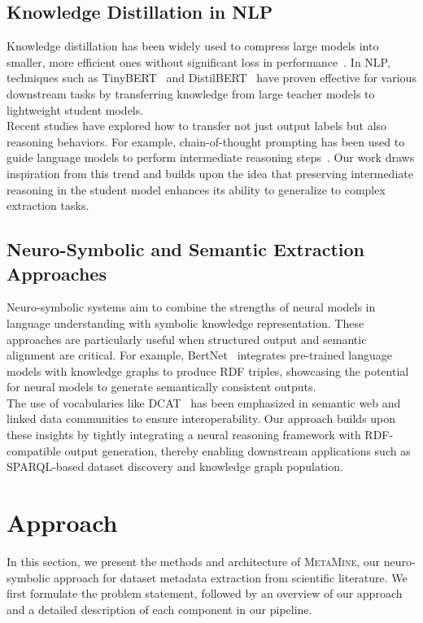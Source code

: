 \documentclass[runningheads]{llncs}
\begin{document}
\subsection{Knowledge Distillation in NLP}
Knowledge distillation has been widely used to compress large models into smaller, more efficient ones without significant loss in performance~\cite{hinton2015distilling}. In NLP, techniques such as TinyBERT~\cite{jiao2019tinybert} and DistilBERT~\cite{sanh2019distilbert} have proven effective for various downstream tasks by transferring knowledge from large teacher models to lightweight student models.
\\
\noindent
Recent studies have explored how to transfer not just output labels but also reasoning behaviors. For example, chain-of-thought prompting has been used to guide language models to perform intermediate reasoning steps~\cite{wei2022chain}. Our work draws inspiration from this trend and builds upon the idea that preserving intermediate reasoning in the student model enhances its ability to generalize to complex extraction tasks.

\subsection{Neuro-Symbolic and Semantic Extraction Approaches}
Neuro-symbolic systems aim to combine the strengths of neural models in language understanding with symbolic knowledge representation. These approaches are particularly useful when structured output and semantic alignment are critical. For example, BertNet~\cite{hao2022bertnet} integrates pre-trained language models with knowledge graphs to produce RDF triples, showcasing the potential for neural models to generate semantically consistent outputs.
\\
\noindent
The use of vocabularies like DCAT~\cite{maali2014data} has been emphasized in semantic web and linked data communities to ensure interoperability. Our approach builds upon these insights by tightly integrating a neural reasoning framework with RDF-compatible output generation, thereby enabling downstream applications such as SPARQL-based dataset discovery and knowledge graph population.
\section{Approach}
\label{sec:methodology}
In this section, we present the methods and architecture of \textsc{MetaMine}, our neuro-symbolic approach for dataset metadata extraction from scientific literature. We first formulate the problem statement, followed by an overview of our approach and a detailed description of each component in our pipeline.
\end{document}
